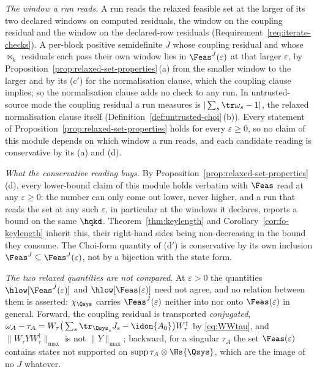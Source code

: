 \begin{remark}\label{rem:feas-tol}
\emph{The window a run reads.} A run reads the relaxed feasible set at the
larger of its two declared windows on computed residuals, the window on
the coupling residual and the window on the declared-row residuals
(Requirement~\ref{req:iterate-checks}). A per-block positive semidefinite
$J$ whose coupling residual and whose $\bowtie_k$ residuals each pass
their own window lies in $\Feas^{J}(\varepsilon)$ at that larger
$\varepsilon$, by Proposition~\ref{prop:relaxed-set-properties}\,(a) from
the smaller window to the larger and by its (c$'$) for the normalisation
clause, which the coupling clause implies; so the normalisation clause
adds no check to any run. In untrusted-source mode the coupling residual
a run measures is $|\sum_s\tr\omega_s-1|$, the relaxed normalisation
clause itself (Definition~\ref{def:untrusted-choi}\,(b)). Every statement
of Proposition~\ref{prop:relaxed-set-properties} holds for every
$\varepsilon\ge0$, so no claim of this module depends on which window a
run reads, and each candidate reading is conservative by its (a) and (d).

\emph{What the conservative reading buys.} By
Proposition~\ref{prop:relaxed-set-properties}\,(d), every lower-bound
claim of this module holds verbatim with $\Feas$ read at any
$\varepsilon\ge0$: the number can only come out lower, never higher, and a
run that reads the set at any such $\varepsilon$, in particular at the
windows it declares, reports a bound on the same $\hqkd$.
Theorem~\ref{thm:keylength} and Corollary~\ref{cor:fo-keylength} inherit
this, their right-hand sides being non-decreasing in the bound they
consume. The Choi-form quantity of (d$'$) is conservative by its own
inclusion $\Feas^{J}\subseteq\Feas^{J}(\varepsilon)$, not by a bijection
with the state form.

\emph{The two relaxed quantities are not compared.} At $\varepsilon>0$ the
quantities $\hlow[\Feas^{J}(\varepsilon)]$ and $\hlow[\Feas(\varepsilon)]$
need not agree, and no relation between them is asserted:
$\chi_{\Qsys}$ carries $\Feas^{J}(\varepsilon)$ neither into nor onto
$\Feas(\varepsilon)$ in general. Forward, the coupling residual is
transported \emph{conjugated},
$\omega_A-\tau_A=W_{\tau}\big(\sum_s\tr_{\Qsys_s}J_s-\idon{A_0}\big)
W_{\tau}^{\dagger}$ by \eqref{eq:WWtau}, and
$\|W_{\tau}YW_{\tau}^{\dagger}\|_{\max}$ is not $\|Y\|_{\max}$; backward,
for a singular $\tau_A$ the set $\Feas(\varepsilon)$ contains states not
supported on $\operatorname{supp}\tau_A\otimes\Hs{\Qsys}$, which are the
image of no $J$ whatever.


\end{remark}
